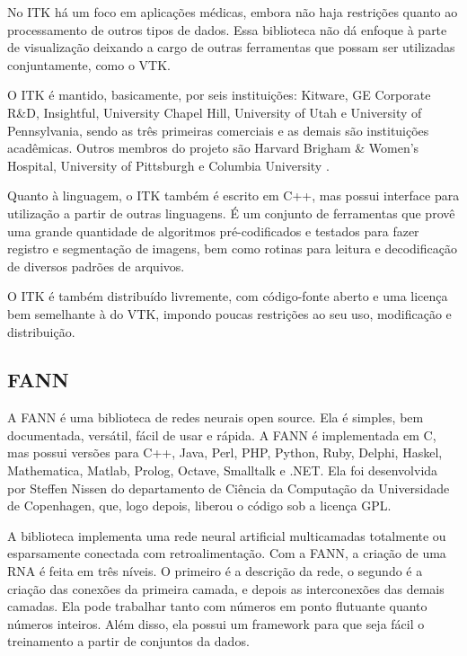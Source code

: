 No ITK há um foco em aplicações médicas, embora não haja restrições quanto ao processamento de outros tipos de dados. Essa biblioteca não dá enfoque à parte de visualização deixando a cargo de outras ferramentas que possam ser utilizadas conjuntamente, como o VTK.

O ITK é mantido, basicamente, por seis instituições: Kitware, GE Corporate R\&D, Insightful, University Chapel Hill, University of Utah e University of Pennsylvania, sendo as três primeiras comerciais e as demais são instituições acadêmicas. Outros membros do projeto são Harvard Brigham \& Women's Hospital, University of Pittsburgh e Columbia University \cite{itk-page}.

Quanto à linguagem, o ITK também é escrito em C++, mas possui interface para utilização a partir de outras linguagens. É um conjunto de ferramentas que provê uma grande quantidade de algoritmos pré-codificados e testados para fazer registro e segmentação de imagens, bem como rotinas para leitura e decodificação de diversos padrões de arquivos.

O ITK é também distribuído livremente, com código-fonte aberto e uma licença bem semelhante à do VTK, impondo poucas restrições ao seu uso, modificação e distribuição.


\subsection{FANN}

A FANN é uma biblioteca de redes neurais open source. Ela é simples, bem documentada, versátil, fácil de usar e rápida. A FANN é implementada em C, mas possui versões para C++, Java, Perl, PHP, Python, Ruby, Delphi, Haskel, Mathematica, Matlab, Prolog, Octave, Smalltalk e .NET. Ela foi desenvolvida por Steffen Nissen do departamento de Ciência da Computação da Universidade de Copenhagen, que, logo depois, liberou o código sob a licença GPL.

A biblioteca implementa uma rede neural artificial multicamadas totalmente ou esparsamente conectada com retroalimentação. Com a FANN, a criação de uma RNA é feita em três níveis. O primeiro é a descrição da rede, o segundo é a criação das conexões da primeira camada, e depois as interconexões das demais camadas. Ela pode trabalhar tanto com números em ponto flutuante quanto números inteiros. Além disso, ela possui um framework para que seja fácil o treinamento a partir de conjuntos da dados.

